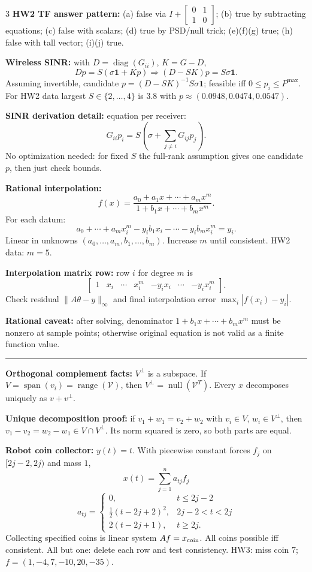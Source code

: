 \documentclass[10pt]{article}
\newcommand{\sect}[1]{\vspace{0.9pt}{\fontsize{7.2}{7.5}\selectfont\textbf{#1}}\vspace{0.25pt}\hrule\vspace{0.8pt}}
\newcommand{\sub}[1]{\textbf{#1}}
\newcommand{\range}{\operatorname{range}}
\newcommand{\nullsp}{\operatorname{null}}
\newcommand{\diag}{\operatorname{diag}}
\newcommand{\one}{\mathbf{1}}
\begin{document}
\begin{multicols*}{3}
\sub{HW2 TF answer pattern:} (a) false via $I+\begin{bmatrix}0&1\\1&0\end{bmatrix}$; (b) true by subtracting equations; (c) false with scalars; (d) true by PSD/null trick; (e)(f)(g) true; (h) false with tall vector; (i)(j) true.

\sub{Wireless SINR:} with $D=\diag(G_{ii})$, $K=G-D$,
\[
D p=S(\sigma\one+Kp)\Rightarrow (D-SK)p=S\sigma\one.
\]
Assuming invertible, candidate $p=(D-SK)^{-1}S\sigma\one$; feasible iff $0\le p_i\le P^{\max}$. For HW2 data largest $S\in\{2,\ldots,4\}$ is $3.8$ with $p\approx(0.0948,0.0474,0.0547)$.

\sub{SINR derivation detail:} equation per receiver:
\[
G_{ii}p_i=S\left(\sigma+\sum_{j\ne i}G_{ij}p_j\right).
\]
No optimization needed: for fixed $S$ the full-rank assumption gives one candidate $p$, then just check bounds.

\sub{Rational interpolation:}
\[
f(x)=\frac{a_0+a_1x+\cdots+a_mx^m}{1+b_1x+\cdots+b_mx^m}.
\]
For each datum:
\[
a_0+\cdots+a_mx_i^m-y_ib_1x_i-\cdots-y_ib_mx_i^m=y_i.
\]
Linear in unknowns $(a_0,\ldots,a_m,b_1,\ldots,b_m)$. Increase $m$ until consistent. HW2 data: $m=5$.

\sub{Interpolation matrix row:} row $i$ for degree $m$ is
\[
\begin{bmatrix}1&x_i&\cdots&x_i^m&-y_ix_i&\cdots&-y_ix_i^m\end{bmatrix}.
\]
Check residual $\|A\theta-y\|_\infty$ and final interpolation error $\max_i|f(x_i)-y_i|$.

\sub{Rational caveat:} after solving, denominator $1+b_1x+\cdots+b_mx^m$ must be nonzero at sample points; otherwise original equation is not valid as a finite function value.

\sect{HW3 Patterns}
\sub{Orthogonal complement facts:} $V^\perp$ is a subspace. If $V=\operatorname{span}(v_i)=\range(\mathcal V)$, then $V^\perp=\nullsp(\mathcal V^T)$. Every $x$ decomposes uniquely as $v+v^\perp$.

\sub{Unique decomposition proof:} if $v_1+w_1=v_2+w_2$ with $v_i\in V$, $w_i\in V^\perp$, then $v_1-v_2=w_2-w_1\in V\cap V^\perp$. Its norm squared is zero, so both parts are equal.

\sub{Robot coin collector:} $y(t)=t$. With piecewise constant forces $f_j$ on $[2j-2,2j)$ and mass $1$,
\[
x(t)=\sum_{j=1}^n a_{tj}f_j
\]
\[
a_{tj}=
\begin{cases}
0, & t\le2j-2\\
\frac12(t-2j+2)^2, & 2j-2<t<2j\\
2(t-2j+1), & t\ge2j .
\end{cases}
\]
Collecting specified coins is linear system $Af=x_{\rm coin}$. All coins possible iff consistent. All but one: delete each row and test consistency. HW3: miss coin $7$; $f=(1,-4,7,-10,20,-35)$.


\end{multicols*}
\end{document}
